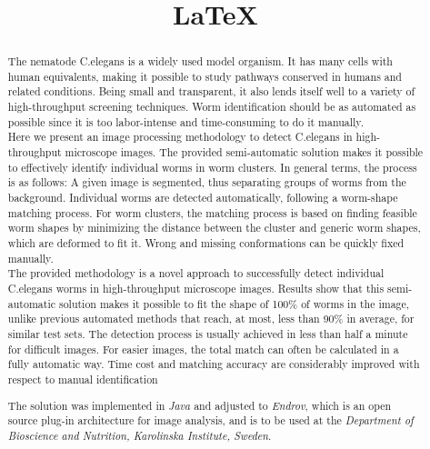 \documentclass[12pt]{article}
\title{\LaTeX}
\date{}
\begin{document}
  \maketitle 
  \begin{abstract}



The nematode C.elegans is a widely used model organism. It has many cells with
human equivalents, making it possible to study pathways conserved in humans
and related conditions. Being small and transparent, it also lends itself well to
a variety of high-throughput screening techniques.
Worm identification should be as automated
as possible since it is too labor-intense and time-consuming to do it manually.\\

Here we present an image processing methodology to detect 
C.elegans in high-throughput microscope images. 
The provided semi-automatic solution makes it possible to effectively identify individual 
worms in worm clusters. In general terms, the process is as follows: 
A given image is segmented, thus 
separating groups of worms from the background. Individual worms are detected
automatically, following a worm-shape matching process. For worm clusters, the 
matching process
is based on finding feasible worm shapes by minimizing the distance between
the cluster and generic worm shapes, which are deformed to fit it.
Wrong and missing conformations can be quickly fixed manually. \\

The provided methodology is a novel approach 
to successfully detect individual C.elegans worms in high-throughput microscope images.
Results show that this semi-automatic solution makes it possible to fit the shape of
100\% of worms in the image, unlike previous automated methods that reach, 
at most, less than 90\% in average, for similar test sets.
The detection process is usually achieved in less than half a minute for difficult images. 
For easier images, the total match can often be calculated in a fully automatic way.
Time cost and matching accuracy are considerably improved 
with respect to manual identification

The solution was implemented in \emph{Java} and adjusted to \emph{Endrov}, which is an open source plug-in architecture for image analysis, and is to be used at the
\emph{Department of Bioscience and Nutrition, Karolinska Institute, Sweden}. 
  \end{abstract}
\end{document}
